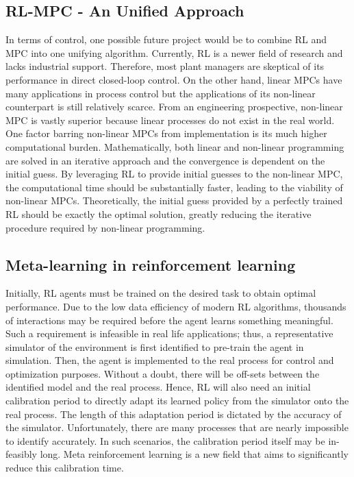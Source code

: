 \subsection{RL-MPC - An Unified Approach}
In terms of control, one possible future project would be to combine RL and MPC into one unifying algorithm.  Currently, RL is a newer field of research and lacks industrial support. Therefore, most plant managers are skeptical of its performance in direct closed-loop control. On the other hand, linear MPCs have many applications in process control but the applications of its non-linear counterpart is still relatively scarce. From an engineering prospective, non-linear MPC is vastly superior because linear processes do not exist in the real world. One factor barring non-linear MPCs from implementation is its much higher computational burden. Mathematically, both linear and non-linear programming are solved in an iterative approach and the convergence is dependent on the initial guess.  By leveraging RL to provide initial guesses to the non-linear MPC, the computational time should be substantially faster, leading to the viability of non-linear MPCs. Theoretically, the initial guess provided by a perfectly trained RL should be exactly the optimal solution, greatly reducing the iterative procedure required by non-linear programming.  

\subsection{Meta-learning in reinforcement learning}
Initially, RL agents must be trained on the desired task to obtain optimal performance.  Due to the low data efficiency of modern RL algorithms, thousands of interactions may be required before the agent learns something meaningful.  Such a requirement is infeasible in real life applications; thus, a representative simulator of the environment is first identified to pre-train the agent in simulation.  Then, the agent is implemented to the real process for control and optimization purposes.  Without a doubt, there will be off-sets between the identified model and the real process. Hence, RL will also need an initial calibration period to directly adapt its learned policy from the simulator onto the real process.  The length of this adaptation period is dictated by the accuracy of the simulator.  Unfortunately, there are many processes that are nearly impossible to identify accurately.  In such scenarios, the calibration period itself may be in-feasibly long. Meta reinforcement learning is a new field that aims to significantly reduce this calibration time.

